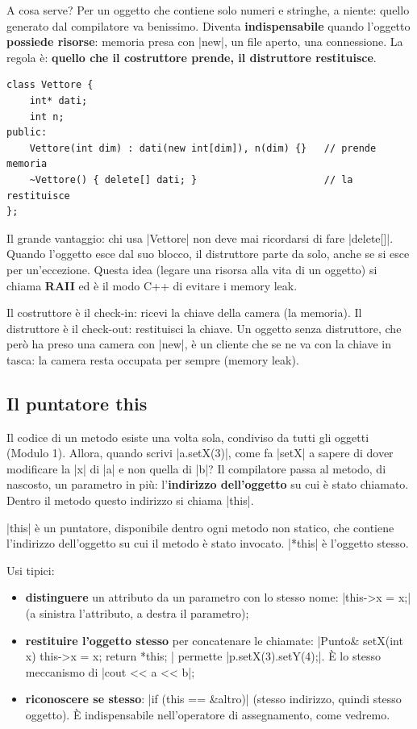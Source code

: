 A cosa serve? Per un oggetto che contiene solo numeri e stringhe, a niente: quello
generato dal compilatore va benissimo. Diventa \textbf{indispensabile} quando
l'oggetto \textbf{possiede risorse}: memoria presa con \cc|new|, un file aperto,
una connessione. La regola è: \textbf{quello che il costruttore prende, il
distruttore restituisce}.
\begin{lstlisting}
class Vettore {
    int* dati;
    int n;
public:
    Vettore(int dim) : dati(new int[dim]), n(dim) {}   // prende memoria
    ~Vettore() { delete[] dati; }                      // la restituisce
};
\end{lstlisting}
Il grande vantaggio: chi usa \cc|Vettore| non deve mai ricordarsi di fare
\cc|delete[]|. Quando l'oggetto esce dal suo blocco, il distruttore parte da solo,
anche se si esce per un'eccezione. Questa idea (legare una risorsa alla vita di un
oggetto) si chiama \textbf{RAII} ed è il modo C++ di evitare i memory leak.

\begin{analogia}
Il costruttore è il check-in: ricevi la chiave della camera (la memoria). Il
distruttore è il check-out: restituisci la chiave. Un oggetto senza distruttore,
che però ha preso una camera con \cc|new|, è un cliente che se ne va con la chiave
in tasca: la camera resta occupata per sempre (memory leak).
\end{analogia}

\subsection*{Il puntatore this}

Il codice di un metodo esiste una volta sola, condiviso da tutti gli oggetti
(Modulo 1). Allora, quando scrivi \cc|a.setX(3)|, come fa \cc|setX| a sapere di
dover modificare la \cc|x| di \cc|a| e non quella di \cc|b|? Il compilatore passa
al metodo, di nascosto, un parametro in più: l'\textbf{indirizzo dell'oggetto} su
cui è stato chiamato. Dentro il metodo questo indirizzo si chiama \cc|this|.

\begin{definizione}[: this]
\cc|this| è un puntatore, disponibile dentro ogni metodo non statico, che contiene
l'indirizzo dell'oggetto su cui il metodo è stato invocato. \cc|*this| è l'oggetto
stesso.
\end{definizione}

Usi tipici:
\begin{itemize}
  \item \textbf{distinguere} un attributo da un parametro con lo stesso nome:
        \cc|this->x = x;| (a sinistra l'attributo, a destra il parametro);
  \item \textbf{restituire l'oggetto stesso} per concatenare le chiamate:
        \cc|Punto& setX(int x) { this->x = x; return *this; }| permette
        \cc|p.setX(3).setY(4);|. È lo stesso meccanismo di \cc|cout << a << b|;
  \item \textbf{riconoscere se stesso}: \cc|if (this == &altro)| (stesso
        indirizzo, quindi stesso oggetto). È indispensabile nell'operatore di
        assegnamento, come vedremo.
\end{itemize}


